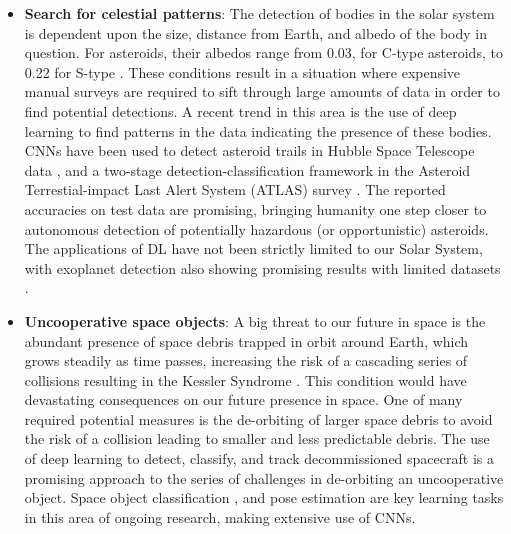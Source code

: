 \begin{itemize}
    \item \textbf{Search for celestial patterns}: The detection of bodies in the solar system is dependent upon the size, distance from Earth, and albedo of the body in question. For asteroids, their albedos range from 0.03, for C-type asteroids, to 0.22 for S-type \cite{planetary_data}. These conditions result in a situation where expensive manual surveys are required to sift through large amounts of data in order to find potential detections. A recent trend in this area is the use of deep learning to find patterns in the data indicating the presence of these bodies. \glspl{CNN} have been used to detect asteroid trails in Hubble Space Telescope data \cite{parfeni2020detection}, and a two-stage detection-classification framework in the Asteroid Terrestial-impact Last Alert System (ATLAS) survey \cite{Chyba_Rabeendran_2021}. The reported accuracies on test data are promising, bringing humanity one step closer to autonomous detection of potentially hazardous (or opportunistic) asteroids. The applications of \gls{DL} have not been strictly limited to our Solar System, with exoplanet detection also showing promising results with limited datasets \cite{bird2020model}.

    \item \textbf{Uncooperative space objects}: A big threat to our future in space is the abundant presence of space debris trapped in orbit around Earth, which grows steadily as time passes, increasing the risk of a cascading series of collisions resulting in the Kessler Syndrome \cite{https://doi.org/10.1029/JA083iA06p02637}. This condition would have devastating consequences on our future presence in space. One of many required potential measures is the de-orbiting of larger space debris to avoid the risk of a collision leading to smaller and less predictable debris. The use of deep learning to detect, classify, and track decommissioned spacecraft is a promising approach to the series of challenges in de-orbiting an uncooperative object. Space object classification \cite{doi:10.1177/0954410021996129, 8009786}, and pose estimation \cite{Afshar2020, Ren2020} are key learning tasks in this area of ongoing research, making extensive use of \glspl{CNN}.


\end{itemize}

